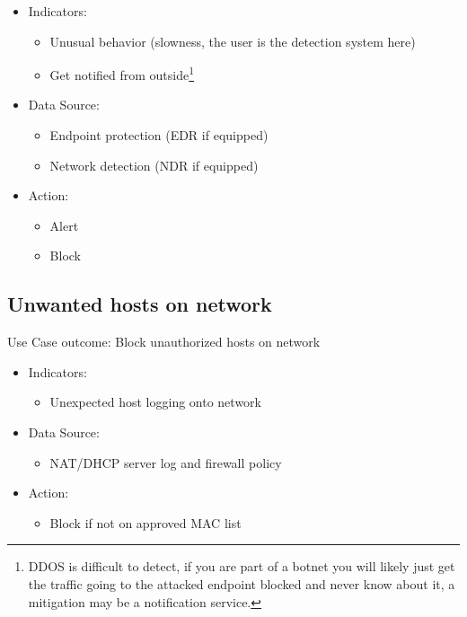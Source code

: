 \documentclass[
	letterpaper, %
	10pt, %
	unnumberedsections, %
	twoside, %
]{APAAssignment}
\begin{document}
\begin{spacing}{1}
	\begin{itemize}
		\item Indicators:
		      \begin{itemize}
			      \item Unusual behavior (slowness, the user is the detection system here)
			      \item Get notified from outside\footnote{DDOS is difficult to detect, if you are part of a botnet you will likely just get the traffic going to the attacked endpoint blocked and never know about it, a mitigation may be a notification service.}
		      \end{itemize}
		\item Data Source:
		      \begin{itemize}
			      \item Endpoint protection (EDR if equipped)
			      \item Network detection (NDR if equipped)
		      \end{itemize}
		\item Action:
		      \begin{itemize}
			      \item Alert
			      \item Block
		      \end{itemize}
	\end{itemize}
\end{spacing}

\subsection{Unwanted hosts on network}
Use Case outcome: Block unauthorized hosts on network
\begin{spacing}{1}
	\begin{itemize}
		\item Indicators:
		      \begin{itemize}
			      \item Unexpected host logging onto network
		      \end{itemize}
		\item Data Source:
		      \begin{itemize}
			      \item NAT/DHCP server log and firewall policy
		      \end{itemize}
		\item Action:
		      \begin{itemize}
			      \item Block if not on approved MAC list
		      \end{itemize}
	\end{itemize}
\end{spacing}
\end{document}
